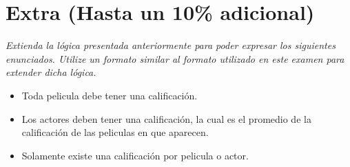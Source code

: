 \documentclass{article}
\begin{document}
\section*{Extra (Hasta un 10\% adicional)}
\emph{Extienda la l\'ogica presentada anteriormente para poder expresar
los siguientes enunciados. Utilize un formato similar al formato
utilizado en este examen para extender dicha l\'ogica.}
\begin{itemize}
        \item{Toda pelicula debe tener una calificaci\'on.}
        \item{Los actores deben tener una calificaci\'on, la cual es
        el promedio de la calificaci\'on de las peliculas en que aparecen.}
        \item{Solamente existe una calificaci\'on por pelicula o actor.}
\end{itemize}
\end{document}
